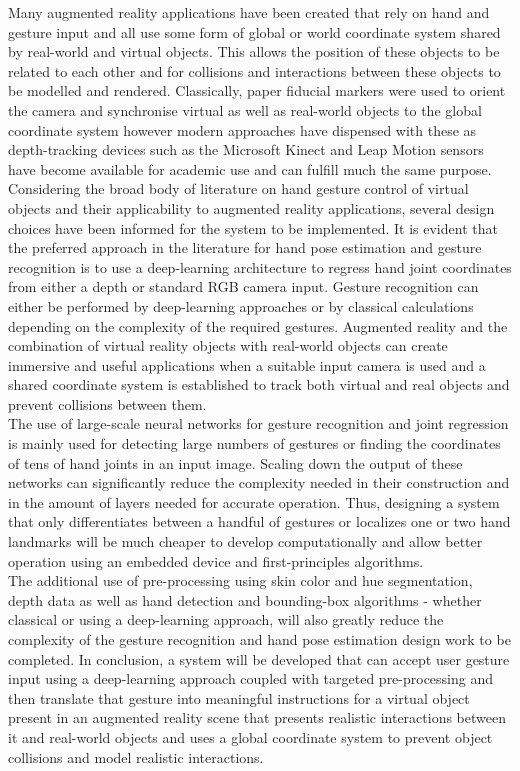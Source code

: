 Many augmented reality applications have been created that rely on hand and gesture input and all use some form of global or world coordinate system shared by real-world and virtual objects. This allows the position of these objects to be related to each other and for collisions and interactions between these objects to be modelled and rendered. Classically, paper fiducial markers were used to orient the camera and synchronise virtual as well as real-world objects to the global coordinate system however modern approaches have dispensed with these as depth-tracking devices such as the Microsoft Kinect and Leap Motion sensors have become available for academic use and can fulfill much the same purpose. \\

Considering the broad body of literature on hand gesture control of virtual objects and their applicability to augmented reality applications, several design choices have been informed for the system to be implemented. It is evident that the preferred approach in the literature for hand pose estimation and gesture recognition is to use a deep-learning architecture to regress hand joint coordinates from either a depth or standard RGB camera input. Gesture recognition can either be performed by deep-learning approaches or by classical calculations depending on the complexity of the required gestures. Augmented reality and the combination of virtual reality objects with real-world objects can create immersive and useful applications when a suitable input camera is used and a shared coordinate system is established to track both virtual and real objects and prevent collisions between them. \\

The use of large-scale neural networks for gesture recognition and joint regression is mainly used for detecting large numbers of gestures or finding the coordinates of tens of hand joints in an input image. Scaling down the output of these networks can significantly reduce the complexity needed in their construction and in the amount of layers needed for accurate operation. Thus, designing a system that only differentiates between a handful of gestures or localizes one or two hand landmarks will be much cheaper to develop computationally and allow better operation using an embedded device and first-principles algorithms. \\

The additional use of pre-processing using skin color and hue segmentation, depth data as well as hand detection and bounding-box algorithms - whether classical or using a deep-learning approach, will also greatly reduce the complexity of the gesture recognition and hand pose estimation design work to be completed. In conclusion, a system will be developed that can accept user gesture input using a deep-learning approach coupled with targeted pre-processing and then translate that gesture into meaningful instructions for a virtual object present in an augmented reality scene that presents realistic interactions between it and real-world objects and uses a global coordinate system to prevent object collisions and model realistic interactions. \\

